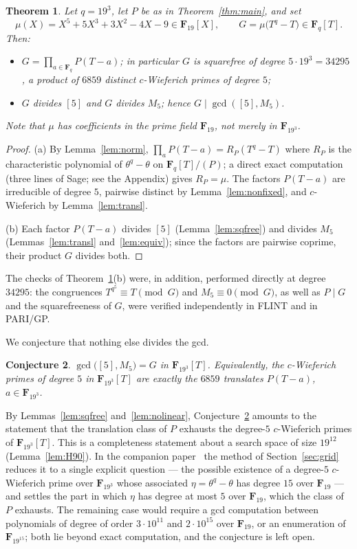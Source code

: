 \documentclass[10pt,a4paper]{amsart}
\newcommand{\F}{\mathbf{F}}
\newtheorem{theorem}{Theorem}[section]
\newtheorem{conjecture}[theorem]{Conjecture}
\begin{document}
\begin{theorem}\label{thm:closed}
Let $q=19^3$, let $P$ be as in Theorem~\ref{thm:main}, and set
\[
\mu(X)=X^5+5X^3+3X^2-4X-9\in\F_{19}[X],\qquad G=\mu\bigl(T^q-T\bigr)\in\F_q[T].
\]
Then:
\begin{itemize}
\item[(a)] $G=\prod_{a\in\F_q}P(T-a)$; in particular $G$ is squarefree of
degree $5\cdot19^3=34295$, a product of $6859$ distinct $c$-Wieferich primes of
degree $5$;
\item[(b)] $G$ divides $[5]$ and $G$ divides $M_5$; hence $G\mid\gcd([5],M_5)$.
\end{itemize}
Note that $\mu$ has coefficients in the prime field $\F_{19}$, not merely in
$\F_{19^3}$.
\end{theorem}

\begin{proof}
(a) By Lemma~\ref{lem:norm}, $\prod_a P(T-a)=R_P(T^q-T)$ where $R_P$ is the
characteristic polynomial of $\theta^q-\theta$ on $\F_q[T]/(P)$; a direct exact
computation (three lines of Sage; see the Appendix) gives $R_P=\mu$. The factors
$P(T-a)$ are irreducible of degree $5$, pairwise distinct by
Lemma~\ref{lem:nonfixed}, and $c$-Wieferich by Lemma~\ref{lem:transl}.

(b) Each factor $P(T-a)$ divides $[5]$ (Lemma~\ref{lem:sqfree}) and divides
$M_5$ (Lemmas~\ref{lem:transl} and~\ref{lem:equiv}); since the factors are
pairwise coprime, their product $G$ divides both.
\end{proof}


The checks of Theorem~\ref{thm:closed}(b) were, in addition, performed directly
at degree $34295$: the congruences $T^{q^5}\equiv T\pmod G$ and
$M_5\equiv0\pmod G$, as well as $P\mid G$ and the squarefreeness of $G$, were
verified independently in FLINT and in PARI/GP.

We conjecture that nothing else divides the gcd.

\begin{conjecture}\label{conj:exact}
$\gcd\bigl([5],M_5\bigr)=G$ in $\F_{19^3}[T]$. Equivalently, the $c$-Wieferich
primes of degree $5$ in $\F_{19^3}[T]$ are exactly the $6859$ translates
$P(T-a)$, $a\in\F_{19^3}$.
\end{conjecture}

By Lemmas~\ref{lem:sqfree} and~\ref{lem:nolinear}, Conjecture~\ref{conj:exact}
amounts to the statement that the translation class of $P$ exhausts the
degree-$5$ $c$-Wieferich primes of $\F_{19^3}[T]$. This is a completeness
statement about a search space of size $19^{12}$ (Lemma~\ref{lem:H90}). In the
companion paper~\cite{NG2} the method of Section~\ref{sec:grid} reduces it to a
single explicit question --- the possible existence of a degree-$5$
$c$-Wieferich prime over $\F_{19^3}$ whose associated $\eta=\theta^q-\theta$ has
degree $15$ over $\F_{19}$ --- and settles the part in which $\eta$ has degree
at most $5$ over $\F_{19}$, which the class of $P$ exhausts. The remaining case
would require a gcd computation between polynomials of degree of order
$3\cdot10^{11}$ and $2\cdot10^{15}$ over $\F_{19}$, or an enumeration of
$\F_{19^{15}}$; both lie beyond exact computation, and the conjecture is left
open.
\end{document}
